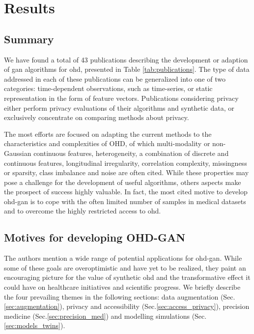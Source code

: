 \section{Results}
    \subsection{Summary}
        We have found a total of 43 publications describing the development or adaption of \gls{gan} algorithms for \gls{ohd}, presented in Table \ref{tab:publications}. The type of data addressed in each of these publications can be generalized into one of two categories: time-dependent observations, such as time-series, or static representation in the form of feature vectors. Publications considering privacy either perform privacy evaluations of their algorithms and synthetic data, or exclusively concentrate on comparing methods about privacy.
        
        The most efforts are focused on adapting the current methods to the characteristics and complexities of OHD, of which multi-modality or non-Gaussian continuous features, heterogeneity, a combination of discrete and continuous features, longitudinal irregularity, correlation complexity, missingness or sparsity, class imbalance and noise are often cited. While these properties may pose a challenge for the development of useful algorithms, others aspects make the prospect of success highly valuable. In fact, the most cited motive to develop \gls{ohd-gan} is to cope with the often limited number of samples in medical datasets and to overcome the highly restricted access to \gls{ohd}.\par
        
    \subsection{Motives for developing OHD-GAN}
        The authors mention a wide range of potential applications for \gls{ohd-gan}. While some of these goals are overoptimistic and have yet to be realized, they paint an encouraging picture for the value of synthetic \gls{ohd} and the transformative effect it could have on healthcare initiatives and scientific progress. We briefly describe the four prevailing themes in the following sections: data augmentation (Sec.\ref{sec:augmentation}), privacy and accessibility (Sec.\ref{sec:access_privacy}), precision medicine (Sec.\ref{sec:precision_med}) and  modelling simulations (Sec.\ref{sec:models_twins}). 

